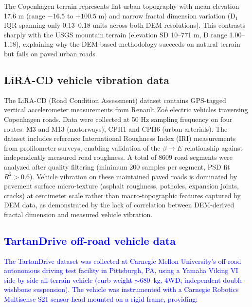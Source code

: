 \documentclass[11pt]{article}
\begin{document}
The Copenhagen terrain represents flat urban topography with mean elevation 17.6 m (range $-16.5$ to $+100.5$ m) and narrow fractal dimension variation (D$_1$ IQR spanning only 0.13--0.18 units across both DEM resolutions). This contrasts sharply with the USGS mountain terrain (elevation SD 10--771 m, D range 1.00--1.18), explaining why the DEM-based methodology succeeds on natural terrain but fails on paved urban roads.

\subsection*{LiRA-CD vehicle vibration data}

The LiRA-CD (Road Condition Assessment) dataset\cite{Skar2023} contains GPS-tagged vertical accelerometer measurements from Renault Zo\'{e} electric vehicles traversing Copenhagen roads. Data were collected at 50 Hz sampling frequency on four routes: M3 and M13 (motorways), CPH1 and CPH6 (urban arterials). The dataset includes reference International Roughness Index (IRI) measurements from profilometer surveys, enabling validation of the $\beta \rightarrow E$ relationship against independently measured road roughness. A total of 8609 road segments were analyzed after quality filtering (minimum 200 samples per segment, PSD fit $R^2 > 0.6$). Vehicle vibration on these maintained paved roads is dominated by pavement surface micro-texture (asphalt roughness, potholes, expansion joints, cracks) at centimeter scale rather than macro-topographic features captured by DEM data, as demonstrated by the lack of correlation between DEM-derived fractal dimension and measured vehicle vibration.

\textcolor{blue}{\subsection*{TartanDrive off-road vehicle data}}

\textcolor{blue}{The TartanDrive dataset\cite{Triest2022} was collected at Carnegie Mellon University's off-road autonomous driving test facility in Pittsburgh, PA, using a Yamaha Viking VI side-by-side all-terrain vehicle (curb weight $\sim$680~kg, 4WD, independent double-wishbone suspension). The vehicle was instrumented with a Carnegie Robotics Multisense S21 sensor head mounted on a rigid frame, providing:}
\end{document}
